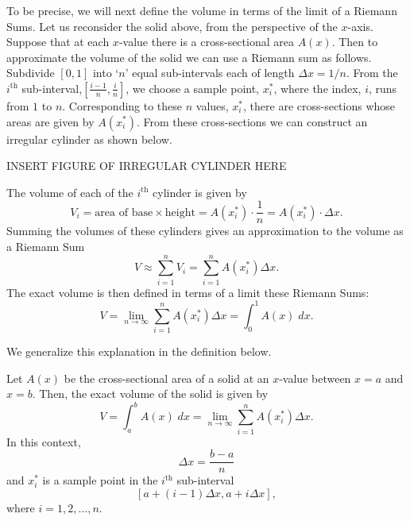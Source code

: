 \documentclass{ximera}
\begin{document}
\begin{explanation}
To be precise, we will next define the volume in terms of the limit of a Riemann Sums.  
Let us reconsider the solid above, from the perspective of the $x$-axis. Suppose that at
each $x$-value there is a cross-sectional area $A(x)$. Then to approximate the volume of the solid we 
can use a Riemann sum as follows. Subdivide $[0,1]$ into `$n$' equal sub-intervals each of length $\Delta x = 1/n$.
From the $i^\text{th}$ sub-interval,$\left[\frac{i-1}{n}, \frac{i}{n}\right]$, we choose a sample point, $x_i^*$, where 
the index, $i$, runs from $1$ to $n$. 
Corresponding to these $n$ values, $x_i^*$, there are cross-sections whose areas are given by $A(x_i^*)$.
From these cross-sections we can construct an irregular cylinder as shown below.

INSERT FIGURE OF IRREGULAR CYLINDER HERE

The volume of each of the $i^\text{th}$ cylinder is given by
\[
V_i = \text{area of base} \times \text{height} = A(x_i^*) \cdot \frac{1}{n} = A(x_i^*) \cdot \Delta x.
\]
Summing the volumes of these cylinders gives an approximation to the volume as a Riemann Sum
\[
V \approx \sum_{i=1}^n V_i = \sum_{i=1}^n A(x_i^*) \Delta x.
\]
The exact volume is then defined in terms of a limit these Riemann Sums:
\[
V = \lim_{n \to \infty} \sum_{i=1}^n A(x_i^*) \Delta x = \int_0^1 A(x) \; dx.
\]

\end{explanation}

We generalize this explanation in the definition below.

\begin{definition}
Let $A(x)$ be the cross-sectional area of a solid at an $x$-value between $x = a$ and $x=b$. Then, the exact volume of the solid is given by
\[
V = \int_a^b A(x) \; dx = \lim_{n \to \infty} \sum_{i=1}^n A(x_i^*) \Delta x.
\]
In this context, 
\[
\Delta x = \frac{b-a}{n}
\] 
and $x_i^*$ is a sample point in the $i^\text{th}$ sub-interval
\[
[a + (i-1)\Delta x, a + i\Delta x],
\]
where $i = 1, 2, \dots, n$.
\end{definition}
\end{document}
